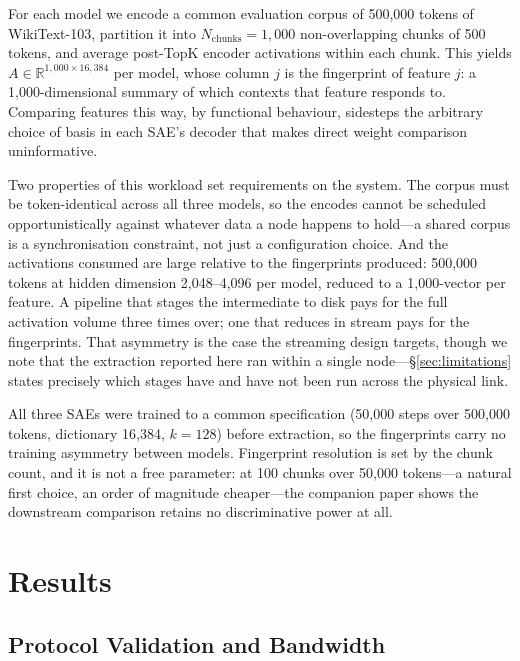 \documentclass[11pt]{article}
\begin{document}
For each model we encode a common evaluation corpus of 500,000 tokens of WikiText-103, partition it into $N_{\mathrm{chunks}} = 1{,}000$ non-overlapping chunks of 500 tokens, and average post-TopK encoder activations within each chunk. This yields $A \in \mathbb{R}^{1{,}000 \times 16{,}384}$ per model, whose column $j$ is the fingerprint of feature $j$: a 1,000-dimensional summary of which contexts that feature responds to. Comparing features this way, by functional behaviour, sidesteps the arbitrary choice of basis in each SAE's decoder that makes direct weight comparison uninformative.

Two properties of this workload set requirements on the system. The corpus must be token-identical across all three models, so the encodes cannot be scheduled opportunistically against whatever data a node happens to hold---a shared corpus is a synchronisation constraint, not just a configuration choice. And the activations consumed are large relative to the fingerprints produced: 500,000 tokens at hidden dimension 2,048--4,096 per model, reduced to a 1,000-vector per feature. A pipeline that stages the intermediate to disk pays for the full activation volume three times over; one that reduces in stream pays for the fingerprints. That asymmetry is the case the streaming design targets, though we note that the extraction reported here ran within a single node---\S\ref{sec:limitations} states precisely which stages have and have not been run across the physical link.

All three SAEs were trained to a common specification (50,000 steps over 500,000 tokens, dictionary 16,384, $k = 128$) before extraction, so the fingerprints carry no training asymmetry between models. Fingerprint resolution is set by the chunk count, and it is not a free parameter: at 100 chunks over 50,000 tokens---a natural first choice, an order of magnitude cheaper---the companion paper shows the downstream comparison retains no discriminative power at all.

\section{Results}
\label{sec:results}

\subsection{Protocol Validation and Bandwidth}
\label{sec:protocol-validation}
\end{document}
